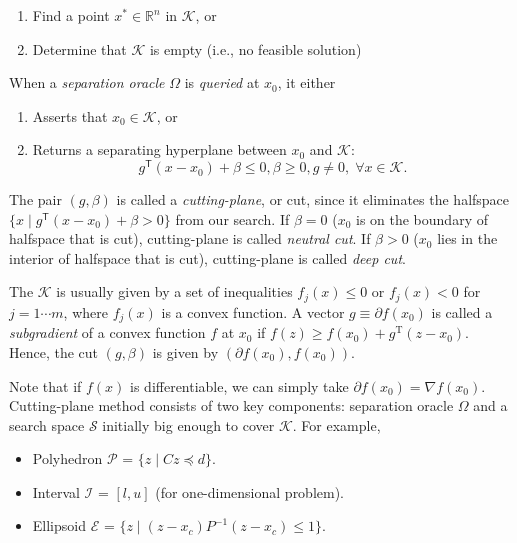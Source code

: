 \documentclass[final,leqno]{siamltex}
\providecommand{\tightlist}{%
  \setlength{\itemsep}{0pt}\setlength{\parskip}{0pt}}
\begin{document}
\begin{enumerate}
\def\labelenumi{\arabic{enumi}.}
\tightlist
\item
  Find a point \(x^* \in \mathbb{R}^n\) in \(\mathcal{K}\), or
\item
  Determine that \(\mathcal{K}\) is empty (i.e., no feasible solution)
\end{enumerate}

When a \emph{separation oracle} \(\Omega\) is \emph{queried} at \(x_0\), it either

\begin{enumerate}
\def\labelenumi{\arabic{enumi}.}
\tightlist
\item
  Asserts that \(x_0 \in \mathcal{K}\), or
\item
  Returns a separating hyperplane between \(x_0\) and \(\mathcal{K}\):
  \begin{equation}g^\mathsf{T} (x - x_0) + \beta \leq 0, \beta \ge 0, g \neq 0, \; \forall x \in \mathcal{K}.\label{eq:cut}\end{equation}
\end{enumerate}

The pair \((g, \beta)\) is called a \emph{cutting-plane}, or cut, since it eliminates the halfspace \(\{x \mid g^\mathsf{T} (x - x_0) + \beta > 0\}\) from our search. If \(\beta=0\) (\(x_0\) is on the boundary of halfspace that is cut), cutting-plane is called \emph{neutral cut}. If \(\beta>0\) (\(x_0\) lies in the interior of halfspace that is cut), cutting-plane is called \emph{deep cut}.

The \(\mathcal{K}\) is usually given by a set of inequalities \(f_j(x) \le 0\) or \(f_j(x) < 0\) for \(j = 1 \cdots m\), where \(f_j(x)\) is a convex function. A vector \(g \equiv \partial f(x_0)\) is called a \emph{subgradient} of a convex function \(f\) at \(x_0\) if \(f(z) \ge f(x_0) + g^\mathrm{T} (z - x_0)\). Hence, the cut \((g, \beta)\) is given by \((\partial f(x_0), f(x_0))\).

Note that if \(f(x)\) is differentiable, we can simply take \(\partial f(x_0) = \nabla f(x_0)\). Cutting-plane method consists of two key components: separation oracle \(\Omega\) and a search space \(\mathcal{S}\) initially big enough to cover \(\mathcal{K}\). For example,

\begin{itemize}
\tightlist
\item
  Polyhedron \(\mathcal{P}\) = \(\{z \mid C z \preceq d \}\).
\item
  Interval \(\mathcal{I}\) = \([l, u]\) (for one-dimensional problem).
\item
  Ellipsoid \(\mathcal{E}\) = \(\{z \mid (z-x_c)P^{-1}(z-x_c) \leq 1 \}\).
\end{itemize}
\end{document}
